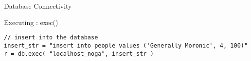\begin{section}{Database Connectivity}
\begin{subsection}{Executing : exec() }
\begin{center}\begin{minipage}{\linewidth}
\begin{lstlisting}[style=JexlStyle]
// insert into the database
insert_str = "insert into people values ('Generally Moronic', 4, 100)"
r = db.exec( "localhost_noga", insert_str )
\end{lstlisting}
\end{minipage}\end{center}

\end{subsection}
 
\end{section}










